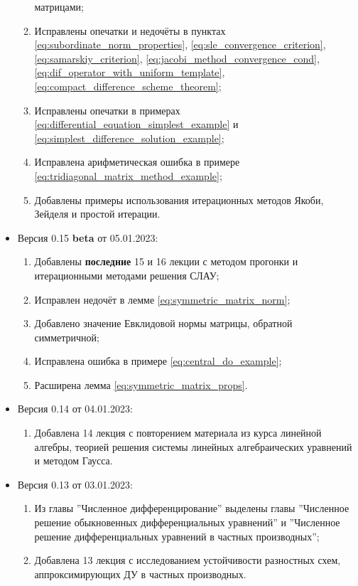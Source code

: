 \documentclass{article}
\begin{document}
\begin{itemize}[nosep]
\begin{enumerate}[nosep]
			матрицами;
		\item Исправлены опечатки и недочёты в пунктах
			\eqref{eq:subordinate_norm_properties},
			\eqref{eq:sle_convergence_criterion},
			\eqref{eq:samarskiy_criterion},
			\eqref{eq:jacobi_method_convergence_cond},
			\eqref{eq:dif_operator_with_uniform_template},
			\eqref{eq:compact_difference_scheme_theorem};
		\item Исправлены опечатки в примерах
			\eqref{eq:differential_equation_simplest_example} и
			\eqref{eq:simplest_difference_solution_example};
		\item Исправлена арифметическая ошибка в примере
			\eqref{eq:tridiagonal_matrix_method_example};
		\item Добавлены примеры использования итерационных методов
			Якоби, Зейделя и простой итерации.
	\end{enumerate}
\item Версия 0.15 \textbf{beta} от 05.01.2023:
	\begin{enumerate}[nosep]
		\item Добавлены \textbf{последние} 15 и 16 лекции с методом
			прогонки и итерационными методами решения СЛАУ;
		\item Исправлен недочёт в лемме
			\eqref{eq:symmetric_matrix_norm};
		\item Добавлено значение Евклидовой нормы матрицы, обратной
			симметричной;
		\item Исправлена ошибка в примере \eqref{eq:central_do_example};
		\item Расширена лемма \eqref{eq:symmetric_matrix_props}.
	\end{enumerate}
\item Версия 0.14 от 04.01.2023:
	\begin{enumerate}[nosep]
		\item Добавлена 14 лекция с повторением материала из курса
			линейной алгебры, теорией решения системы линейных
			алгебраических уравнений и методом Гаусса.
	\end{enumerate}
\item Версия 0.13 от 03.01.2023:
	\begin{enumerate}[nosep]
		\item Из главы ''Численное дифференцирование'' выделены главы
			''Численное решение обыкновенных дифференциальных
			уравнений'' и ''Численное решение дифференциальных
			уравнений в частных производных'';
		\item Добавлена 13 лекция с исследованием устойчивости
			разностных схем, аппроксимирующих ДУ в частных
			производных.
	\end{enumerate}
\end{itemize}
\end{document}
